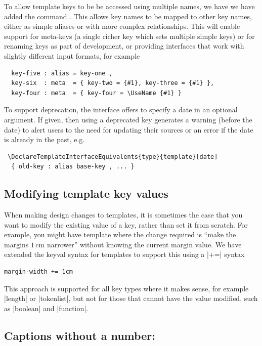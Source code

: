 \documentclass{ltnews}
\begin{document}
To allow template keys to be be accessed using multiple names, we have we
have added the command . This allows
key names to be mapped to other key names, either as simple aliases or with
more complex relationships. This will enable support for meta-keys (a single
richer key which sets multiple simple keys) or for renaming keys as part of
development, or providing interfaces that work with slightly different input
formats, for example
\begin{verbatim}
  key-five : alias = key-one ,
  key-six  : meta  = { key-two = {#1}, key-three = {#1} },
  key-four : meta  = { key-four = \UseName {#1} }
\end{verbatim}
To support deprecation, the interface offers to specify a date in an optional argument. If given, then using a deprecated key generates a warning (before the date) to alert users to the need for updating their sources or an error if the date is already in the past, e.g.
\begin{verbatim}
 \DeclareTemplateInterfaceEquivalents{type}{template}[date]
  { old-key : alias base-key , ... }
\end{verbatim}  

\subsection{Modifying template key values}

When making design changes to templates, it is sometimes the case that you want
to modify the existing value of a key, rather than set it from scratch. For
example, you might have template where the change required is \enquote{make the
margins $1\,\mathrm{cm}$ narrower} without knowing the current margin value. We
have extended the keyval syntax for templates to support this using a |+=|
syntax
\begin{verbatim}
margin-width += 1cm
\end{verbatim}
This approach is supported for all key types where it makes sense, for example
|length| or |tokenlist|, but not for those that cannot have the value modified,
such as |boolean| and |function|.

\subsection{Captions without a number: }
\end{document}
